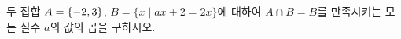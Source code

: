 두 집합 $A=\{-2{,}\mkern3mu\mathopen{}3\}$, $B=\{x \mid ax+2=2x\}$에 대하여 $A\cap B=B$를 만족시키는 모든 실수 $a$의 값의 곱을 구하시오.
